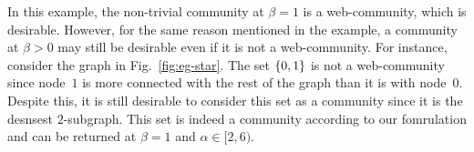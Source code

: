 \begin{example}
	In this example, the non-trivial community at $\beta =1$ is a web-community, which is
desirable. However, for the same reason mentioned in the example, a community at $\beta > 0$ may
still be desirable even if it is not a web-community. For instance, consider the graph in
Fig.~\ref{fig:eg-star}. The set $\{0,1\}$ is not a web-community since node~$1$ is more
connected with the rest of the graph than it is with node~$0$. Despite this, it is still desirable
to consider this set as a community since it is the desnsest $2$-subgraph. This set is indeed a
community according to our fomrulation and can be returned at $\beta=1$ and $\alpha\in [2,6)$. 
\end{example}



